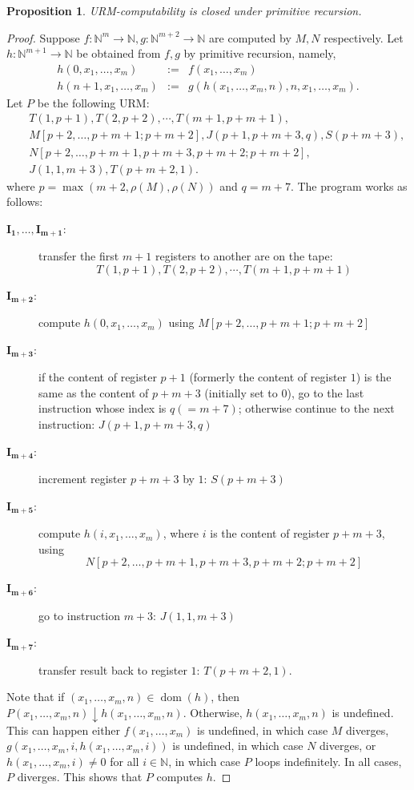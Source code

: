 \documentclass[12pt]{article}
\newtheorem{prop}{Proposition}
\begin{document}
\begin{prop} URM-computability is closed under primitive recursion. \end{prop}
\begin{proof}
Suppose $f:\mathbb{N}^m\to \mathbb{N},g:\mathbb{N}^{m+2}\to \mathbb{N}$ are computed by $M,N$ respectively.  Let $h:\mathbb{N}^{m+1}\to \mathbb{N}$ be obtained from $f,g$ by primitive recursion, namely, 
\begin{eqnarray*}
h(0,x_1,\ldots,x_m)&:=&f(x_1,\ldots,x_m) \\
h(n+1,x_1,\ldots,x_m)&:=& g(h(x_1,\ldots,x_m,n),n,x_1,\ldots,x_m).
\end{eqnarray*}
Let $P$ be the following URM:
\begin{eqnarray*}
&& T(1,p+1),T(2,p+2),\cdots, T(m+1,p+m+1),\\
&& M[p+2,\ldots,p+m+1;p+m+2],J(p+1,p+m+3,q),S(p+m+3),\\
&& N[p+2,\ldots,p+m+1,p+m+3,p+m+2;p+m+2],\\
&& J(1,1,m+3),T(p+m+2,1).
\end{eqnarray*}
where $p=\max(m+2,\rho(M),\rho(N))$ and $q=m+7$.  The program works as follows:
\begin{description}
\item[$\boldsymbol{I_1,\ldots,I_{m+1}}$:] transfer the first $m+1$ registers to another are on the tape:
$$T(1,p+1),T(2,p+2),\cdots, T(m+1,p+m+1)$$
\item[$\boldsymbol{I_{m+2}}$:] compute $h(0,x_1,\ldots,x_m)$ using $M[p+2,\ldots,p+m+1;p+m+2]$
\item[$\boldsymbol{I_{m+3}}$:] if the content of register $p+1$ (formerly the content of register $1$) is the same as the content of $p+m+3$ (initially set to $0$), go to the last instruction whose index is $q(=m+7)$; otherwise continue to the next instruction: $J(p+1,p+m+3,q)$
\item[$\boldsymbol{I_{m+4}}$:] increment register $p+m+3$ by $1$: $S(p+m+3)$
\item[$\boldsymbol{I_{m+5}}$:] compute $h(i,x_1,\ldots,x_m)$, where $i$ is the content of register $p+m+3$, using $$N[p+2,\ldots,p+m+1,p+m+3,p+m+2;p+m+2]$$
\item[$\boldsymbol{I_{m+6}}$:] go to instruction $m+3$: $J(1,1,m+3)$
\item[$\boldsymbol{I_{m+7}}$:] transfer result back to register $1$: $T(p+m+2,1)$.
\end{description}
Note that if $(x_1,\ldots,x_m,n)\in \operatorname{dom}(h)$, then $P(x_1,\ldots,x_m,n)\downarrow \! h(x_1,\ldots,x_m,n)$.  Otherwise, $h(x_1,\ldots,x_m,n)$ is undefined.  This can happen either $f(x_1,\ldots, x_m)$ is undefined, in which case $M$ diverges, $g(x_1,\ldots, x_m,i,h(x_1,\ldots,x_m,i))$ is undefined, in which case $N$ diverges, or $h(x_1,\ldots,x_m,i)\ne 0$ for all $i\in \mathbb{N}$, in which case $P$ loops indefinitely.  In all cases, $P$ diverges.  This shows that $P$ computes $h$.
\end{proof}
\end{document}
